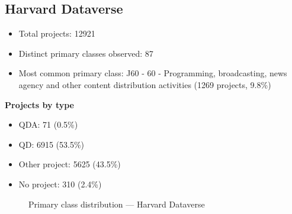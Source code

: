 \subsection{Harvard Dataverse}

\begin{itemize}
    \item Total projects: 12921
    \item Distinct primary classes observed: 87
    \item Most common primary class: J60 - 60 - Programming, broadcasting, news agency and other content distribution activities (1269 projects, 9.8\%)
\end{itemize}
\textbf{Projects by type}
\begin{itemize}
    \item QDA: 71 (0.5\%)
    \item QD: 6915 (53.5\%)
    \item Other project: 5625 (43.5\%)
    \item No project: 310 (2.4\%)
\end{itemize}

\begin{figure}[H]
    \centering
    
    \caption{Primary class distribution --- Harvard Dataverse}
\end{figure}

